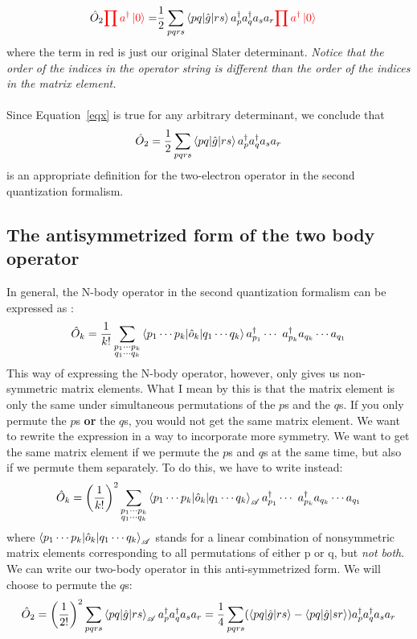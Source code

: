 \documentclass{article}
\newcommand{\dg}{\ensuremath{^\dagger} }
\newcommand{\cd}{\ensuremath{\cdots} }
\begin{document}
\begin{align}
\hat{O}_2  {\color{red} \prod a\dg \ket{0} }= &\frac{1}{2}  \sum_{pqrs}  \braket{pq | \hat{g} | rs}  a\dg_{p}a\dg_{q} a_s a_r {\color{red} \prod a\dg \ket{0} } \label{eqx}
\end{align}
where the term in {\color{red} red} is just our original Slater determinant. \textit{Notice that the order of the indices in the operator string is different than the order of the indices in the matrix element. } \\ \\
Since Equation~\ref{eqx}  is true for any arbitrary determinant, we conclude that 
\begin{equation}
\hat{O}_2 =\frac{1}{2}  \sum_{pqrs}  \braket{pq | \hat{g} | rs}  a\dg_{p}a\dg_{q} a_s a_r
\end{equation}
is an appropriate definition for the two-electron operator in the second quantization formalism.
\\
\subsection{The antisymmetrized form of the two body operator}
In general, the N-body operator in the second quantization formalism can be expressed as :
\[ \hat{O}_k = \frac{1}{k!}   \sum_{\substack{p_1 \cd p_k \\q_1 \cd q_k }}  \braket{ p_1 \cd p_k | \hat{o}_k | q_1 \cd q_k} a_{p_1}\dg \cd \ a_{p_k}\dg a_{q_k} \cd a_{q_1} \]
This way of expressing the N-body operator, however, only gives us non-symmetric matrix elements. 
What I mean by this is that the matrix element is only the same under simultaneous permutations of the $p$s and the $q$s. 
If you only permute the $p$s \textbf{or} the $q$s, you would not get the same matrix element. 
We want to rewrite the expression in a way to incorporate more symmetry.
We want to get the same matrix element if we permute the $p$s and $q$s at the same time, but also if we permute them separately. 
To do this, we have to write instead: 
\[ \hat{O}_k = \left( \frac{1}{k!} \right)^2  \sum_{\substack{p_1 \cd p_k \\q_1 \cd q_k }}  \braket{ p_1 \cd p_k | \hat{o}_k | q_1 \cd q_k}_\mathscr{A} a_{p_1}\dg \cd \ a_{p_k}\dg a_{q_k} \cd a_{q_1} \]
where $\braket{ p_1 \cd p_k | \hat{o}_k | q_1 \cd q_k}_\mathscr{A}$ stands for a linear combination of nonsymmetric matrix elements corresponding to all permutations of either p or q, but \textit{not both}. 
We can write our two-body operator in this anti-symmetrized form. We will choose to permute the $q$s:
\[\hat{O}_2 =\left( \frac{1}{2!} \right)^2  \sum_{pqrs}  \braket{ pq | \hat{g} | rs}_\mathscr{A} a\dg_{p}a\dg_{q} a_s a_r = \frac{1}{4}\sum_{pqrs} ( \braket{ pq | \hat{g} | rs} -  \braket{ pq | \hat{g} | sr} )  a\dg_{p}a\dg_{q} a_s a_r  \]
\end{document}
